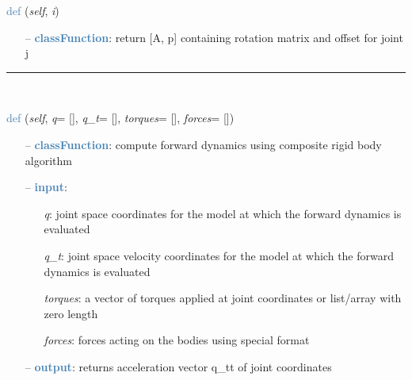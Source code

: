 \begin{itemize}[leftmargin=1.4cm]
\begin{itemize}[leftmargin=0.5cm]
\begin{itemize}[leftmargin=1.4cm]
\begin{itemize}[leftmargin=1.4cm]
\begin{itemize}[leftmargin=0.5cm]
\begin{itemize}[leftmargin=1.4cm]
\begin{itemize}[leftmargin=0.5cm]
\begin{itemize}[leftmargin=1.4cm]
\begin{itemize}[leftmargin=1.4cm]
\begin{itemize}[leftmargin=1.4cm]
\begin{flushleft}
\noindent \textcolor{steelblue}{def {\bf {}}}\label{sec:kinematicTree:KinematicTree:XL}
({\it self}, {\it i})
\end{flushleft}
\setlength{\itemindent}{0.7cm}
\begin{itemize}[leftmargin=0.7cm]
  \item[--]  \textcolor{steelblue}{\bf classFunction}: return [A, p] containing rotation matrix and offset for joint j\vspace{12pt}\end{itemize}
%
\noindent\rule{8cm}{0.75pt}\vspace{1pt} \\ 
\begin{flushleft}
\noindent \textcolor{steelblue}{def {\bf {}}}\label{sec:kinematicTree:KinematicTree:ForwardDynamicsCRB}
({\it self}, {\it q}= [], {\it q\_t}= [], {\it torques}= [], {\it forces}= [])
\end{flushleft}
\setlength{\itemindent}{0.7cm}
\begin{itemize}[leftmargin=0.7cm]
  \item[--]  \textcolor{steelblue}{\bf classFunction}: compute forward dynamics using composite rigid body algorithm  \item[--]  \textcolor{steelblue}{\bf input}: \vspace{-6pt}
  \begin{itemize}[leftmargin=1.2cm]
\setlength{\itemindent}{-0.7cm}
    \item[] {\it q}: joint space coordinates for the model at which the forward dynamics is evaluated
    \item[] {\it   q\_t}: joint space velocity coordinates for the model at which the forward dynamics is evaluated
    \item[] {\it   torques}: a vector of torques applied at joint coordinates or list/array with zero length
    \item[] {\it   forces}: forces acting on the bodies using special format
  \end{itemize}
  \item[--]  \textcolor{steelblue}{\bf output}: returns acceleration vector q\_tt of joint coordinates\vspace{12pt}\end{itemize}

\end{itemize}
\end{itemize}
\end{itemize}
\end{itemize}
\end{itemize}
\end{itemize}
\end{itemize}
\end{itemize}
\end{itemize}
\end{itemize}
